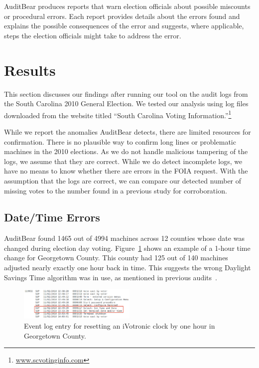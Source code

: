 \documentclass[letterpaper,twocolumn,10pt]{article}
\begin{document}
AuditBear produces reports that warn election officials about possible miscounts
or procedural errors. Each report provides details about the errors found and
explains the possible consequences of the error and suggests, where applicable,
steps the election officials might take to address the error.

\section{Results}
This section discusses our findings after running our tool on the audit logs
from the South Carolina 2010 General Election. We tested our analysis using log
files downloaded from the website titled “South Carolina Voting
Information.”\footnote{\url{www.scvotinginfo.com}} 

While we report the anomalies AuditBear detects, there are limited resources for 
confirmation. There is no plausible way to confirm long lines or problematic 
machines in the 2010 elections. As we do not handle malicious tampering of the 
logs, we assume that they are correct. While we do detect incomplete logs, we 
have no means to know whether there are errors in the FOIA request. With the 
assumption that the logs are correct, we can compare our detected number of 
missing votes to the number found in a previous study for corroboration.  

\subsection{Date/Time Errors}
 AuditBear found 1465 out of 4994 machines across 12 counties whose date was
 changed during election day voting. Figure~\ref{fig:one-hour-reset} shows an
 example of a 1-hour time change for Georgetown County. This county had 125 out
 of 140 machines adjusted nearly exactly one hour back in time. This suggests
 the wrong Daylight Savings Time algorithm was in use, as mentioned in previous
 audits~\cite{Buell2011}.

\begin{figure}[htbp]
\begin{center}
    \includegraphics[width=0.5\textwidth,height=0.1\textheight]{ResetClock.eps}
\end{center}
\caption{Event log entry for resetting an iVotronic clock by one hour in Georgetown County.}
\label{fig:one-hour-reset}
\end{figure}
\end{document}
